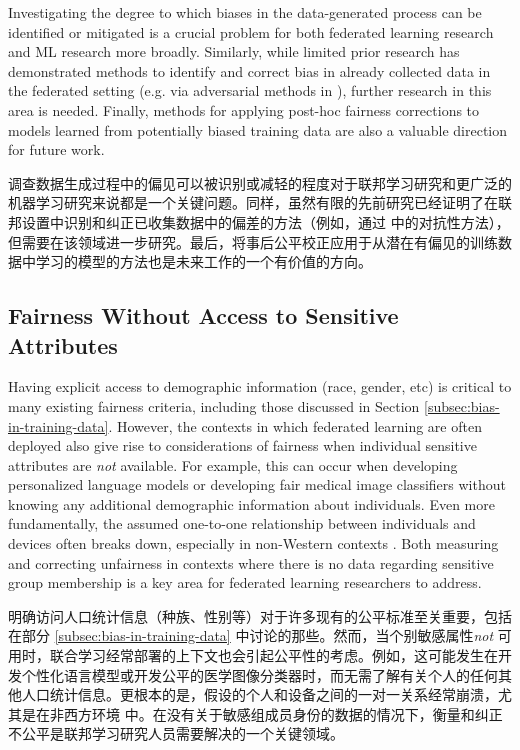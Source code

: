 Investigating the degree to which biases in the data-generated process can be identified or mitigated is a crucial problem for both federated learning research and ML research more broadly. Similarly, while limited prior research has demonstrated methods to identify and correct bias in already collected data in the federated setting (e.g. via adversarial methods in \cite{kairouz20learning}), further research in this area is needed. Finally, methods for applying post-hoc fairness corrections to models learned from potentially biased training data are also a valuable direction for future work.

调查数据生成过程中的偏见可以被识别或减轻的程度对于联邦学习研究和更广泛的机器学习研究来说都是一个关键问题。同样，虽然有限的先前研究已经证明了在联邦设置中识别和纠正已收集数据中的偏差的方法（例如，通过 \cite{kairouz20learning} 中的对抗性方法），但需要在该领域进一步研究。最后，将事后公平校正应用于从潜在有偏见的训练数据中学习的模型的方法也是未来工作的一个有价值的方向。

\subsection{Fairness Without Access to Sensitive Attributes}\label{subsec:fairness-without-sensitive-attributes}

Having explicit access to demographic information (race, gender, etc) is critical to many existing fairness criteria, including those discussed in Section \ref{subsec:bias-in-training-data}. However, the contexts in which federated learning are often deployed also give rise to considerations of fairness when individual sensitive attributes are \textit{not} available. For example, this can occur when developing personalized language models or developing fair medical image classifiers without knowing any additional demographic information about individuals. Even more fundamentally, the assumed one-to-one relationship between individuals and devices often breaks down, especially in non-Western contexts \cite{sambasivan2018privacy}. Both measuring and correcting unfairness in contexts where there is no data regarding sensitive group membership is a key area for federated learning researchers to address.

明确访问人口统计信息（种族、性别等）对于许多现有的公平标准至关重要，包括在部分 \ref{subsec:bias-in-training-data} 中讨论的那些。然而，当个别敏感属性\textit{not} 可用时，联合学习经常部署的上下文也会引起公平性的考虑。例如，这可能发生在开发个性化语言模型或开发公平的医学图像分类器时，而无需了解有关个人的任何其他人口统计信息。更根本的是，假设的个人和设备之间的一对一关系经常崩溃，尤其是在非西方环境\cite{sambasivan2018privacy} 中。在没有关于敏感组成员身份的数据的情况下，衡量和纠正不公平是联邦学习研究人员需要解决的一个关键领域。

